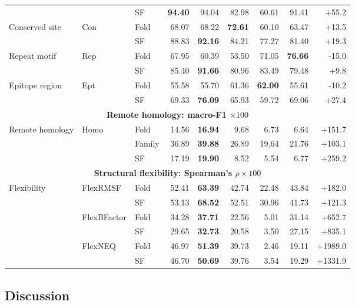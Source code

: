 \begin{table}[p]
{\begin{tabular}{@{}lllrrrrrr@{}}
& & SF & \textbf{94.40} & 94.04 & 82.98 & 60.61 & 91.41 & +55.2 \\
\multirow{2}{*}{Conserved site}
& \multirow{2}{*}{Con} & Fold & 68.07 & 68.22 & \textbf{72.61} & 60.10 & 63.47 & +13.5 \\
& & SF & 88.83 & \textbf{92.16} & 84.21 & 77.27 & 81.40 & +19.3 \\
\multirow{2}{*}{Repeat motif}
& \multirow{2}{*}{Rep} & Fold & 67.95 & 60.39 & 53.50 & 71.05 & \textbf{76.66} & -15.0 \\
& & SF & 85.40 & \textbf{91.66} & 80.96 & 83.49 & 79.48 & +9.8 \\
\multirow{2}{*}{Epitope region}
& \multirow{2}{*}{Ept} & Fold & 55.58 & 55.70 & 61.36 & \textbf{62.00} & 55.61 & -10.2 \\
& & SF & 69.33 & \textbf{76.09} & 65.93 & 59.72 & 69.06 & +27.4 \\
\midrule
\multicolumn{9}{c}{\textbf{Remote homology: macro-F1 $\times100$}} \\
\midrule
\multirow{3}{*}{Remote homology}
& \multirow{3}{*}{Homo} & Fold & 14.56 & \textbf{16.94} & 9.68 & 6.73 & 6.64 & +151.7 \\
& & Family & 36.89 & \textbf{39.88} & 26.89 & 19.64 & 21.76 & +103.1 \\
& & SF & 17.19 & \textbf{19.90} & 8.52 & 5.54 & 6.77 & +259.2 \\
\midrule
\multicolumn{9}{c}{\textbf{Structural flexibility: Spearman's $\rho\times100$}} \\
\midrule
\multirow{6}{*}{Flexibility}
& \multirow{2}{*}{FlexRMSF} & Fold & 52.41 & \textbf{63.39} & 42.74 & 22.48 & 43.84 & +182.0 \\
& & SF & 53.13 & \textbf{68.52} & 52.51 & 30.96 & 41.73 & +121.3 \\
& \multirow{2}{*}{FlexBFactor} & Fold & 34.28 & \textbf{37.71} & 22.56 & 5.01 & 31.14 & +652.7 \\
& & SF & 29.65 & \textbf{32.73} & 20.58 & 3.50 & 27.15 & +835.1 \\
& \multirow{2}{*}{FlexNEQ} & Fold & 46.97 & \textbf{51.39} & 39.73 & 2.46 & 19.11 & +1989.0 \\
& & SF & 46.70 & \textbf{50.69} & 39.76 & 3.54 & 19.29 & +1331.9 \\
\bottomrule
\end{tabular}%
}
\stbpreviewfit
\end{table}
\clearpage

\subsection{Discussion}
\label{sec:results-discussion}

